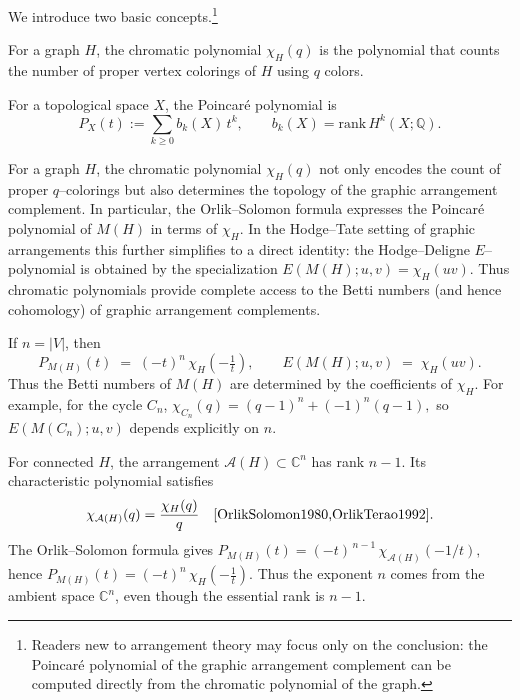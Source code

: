 \documentclass[runningheads]{llncs}
\begin{document}
We introduce two basic concepts.\footnote{Readers new to arrangement theory may focus only on the conclusion: 
the Poincar\'e polynomial of the graphic arrangement complement can be 
computed directly from the chromatic polynomial of the graph.}

\begin{definition}
For a graph $H$, the chromatic polynomial $\chi_H(q)$ is the polynomial that counts the number of proper vertex colorings of $H$ using $q$ colors.
\end{definition}

\begin{definition}
For a topological space $X$, the Poincaré polynomial is
\[
P_X(t) := \sum_{k \ge 0} b_k(X)\,t^k, \qquad b_k(X)=\mathrm{rank}\,H^k(X;\mathbb{Q}).
\]
\end{definition}

For a graph $H$, the chromatic polynomial $\chi_H(q)$ not only encodes the
count of proper $q$--colorings but also determines the topology of the graphic
arrangement complement.  In particular, the Orlik--Solomon formula expresses the
Poincaré polynomial of $M(H)$ in terms of $\chi_H$. 
In the Hodge--Tate setting of graphic arrangements this further simplifies 
to a direct identity: the Hodge--Deligne $E$--polynomial is obtained by the 
specialization $E(M(H);u,v)=\chi_H(uv).$
Thus chromatic polynomials provide complete access to the Betti numbers (and
hence cohomology) of graphic arrangement complements.

\begin{proposition}
\label{prop:chromatic-to-poincare}
If $n=|V|$, then
\[
P_{M(H)}(t) \;=\; (-t)^{n}\,\chi_H\!\left(-\tfrac{1}{t}\right),
\qquad 
E(M(H);u,v) \;=\; \chi_H(uv).
\]
Thus the Betti numbers of $M(H)$ are determined by the coefficients of $\chi_H$.
For example, for the cycle $C_n$, 
\(
\chi_{C_n}(q)=(q-1)^n+(-1)^n(q-1),
\)
so $E(M(C_n);u,v)$ depends explicitly on $n$. 
\end{proposition}


For connected $H$, the arrangement $\mathcal{A}(H)\subset\mathbb{C}^n$ has rank $n-1$.
Its characteristic polynomial satisfies
\[
\chi_{\mathcal{A}(H)}(q)=\frac{\chi_H(q)}{q}
\quad\text{\cite{OrlikSolomon1980,OrlikTerao1992}}.
\]
The Orlik--Solomon formula gives 
$P_{M(H)}(t)=(-t)^{\,n-1}\,\chi_{\mathcal{A}(H)}(-1/t),$ 
hence
$P_{M(H)}(t)=(-t)^n\,\chi_H\!\left(-\tfrac{1}{t}\right).$
Thus the exponent $n$ comes from the ambient space $\mathbb{C}^n$, 
even though the essential rank is $n-1$.
\end{document}
